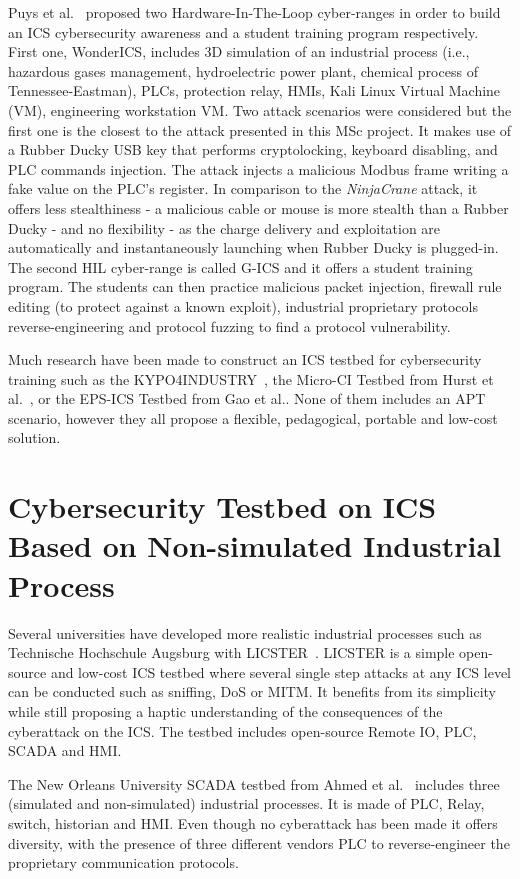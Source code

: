 Puys et al.~\cite{puys21} proposed two Hardware-In-The-Loop cyber-ranges in order to build an ICS cybersecurity awareness and a student training program respectively. First one, WonderICS, includes 3D simulation of an industrial process (i.e., hazardous gases management, hydroelectric power plant, chemical process of Tennessee-Eastman), PLCs, protection relay,  HMIs, Kali Linux Virtual Machine (VM), engineering workstation VM. Two attack scenarios were considered but the first one is the closest to the attack presented in this MSc project. It makes use of a Rubber Ducky USB key that performs cryptolocking, keyboard disabling, and PLC commands injection. The attack injects a malicious Modbus frame writing a fake value on the PLC's register. In comparison to the \emph{NinjaCrane} attack, it offers less stealthiness - a malicious cable or mouse is more stealth than a Rubber Ducky - and no flexibility - as the charge delivery and exploitation are automatically and instantaneously launching when Rubber Ducky is plugged-in. The second HIL cyber-range is called G-ICS and it offers a student training program. The students can then practice malicious packet injection, firewall rule editing (to protect against a known exploit), industrial proprietary protocols reverse-engineering and protocol fuzzing to find a protocol vulnerability.

Much research have been made to construct an ICS testbed for cybersecurity training such as the KYPO4INDUSTRY~\cite{celeda20}, the Micro-CI Testbed from Hurst et al.~\cite{ljmu5763}, or the EPS-ICS Testbed from Gao et al.\cite{Gao13}. None of them includes an APT scenario, however they all propose a flexible, pedagogical, portable and low-cost solution.

\section{Cybersecurity Testbed on ICS Based on Non-simulated Industrial Process}

Several universities have developed more realistic industrial processes such as Technische Hochschule Augsburg with LICSTER~\cite{Sauer19}. LICSTER is a simple open-source and low-cost ICS testbed where several single step attacks at any ICS level can be conducted such as sniffing, DoS or MITM. It benefits from its simplicity while still proposing a haptic understanding of the consequences of the cyberattack on the ICS. The testbed includes open-source Remote IO, PLC, SCADA and HMI. 

The New Orleans University SCADA testbed from Ahmed et al.~\cite{Ahmed16} includes three (simulated and non-simulated) industrial processes. It is made of PLC, Relay, switch, historian and HMI. Even though no cyberattack has been made it offers diversity, with the presence of three different vendors PLC to reverse-engineer the proprietary communication protocols.

